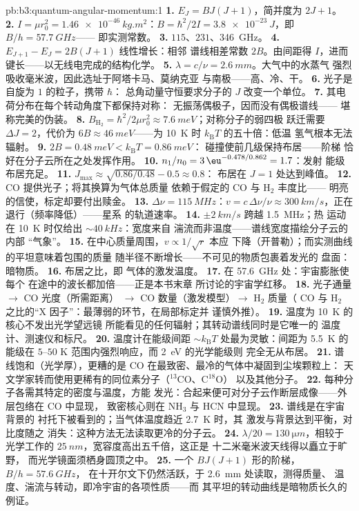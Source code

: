 \begin{solution}{pb:b3:quantum-angular-momentum:1}
\textbf{1.} $E_J = BJ(J+1)$，简并度为 $2J + 1$。
\textbf{2.} $I = \mu r_0^2 = \qty{1.46e-46}{kg.m^2}$：$B =
\hbar^2/2I = \qty{3.8e-23}{J}$，即 $B/h = \qty{57.7}{GHz}$——
即实测常数。
\textbf{3.} $115$、$231$、\qty{346}{GHz}。
\textbf{4.} $E_{J+1} - E_J = 2B(J+1)$ 线性增长：相邻
谱线相差常数 $2B$。由间距得 $I$，进而
键长——以无线电完成的结构化学。
\textbf{5.} $\lambda = c/\nu = \qty{2.6}{mm}$。大气中的水蒸气
强烈吸收毫米波，因此选址于阿塔卡马、莫纳克亚
与南极——高、冷、干。
\textbf{6.} 光子是自旋为 $1$ 的粒子，携带 $\hbar$：
总角动量守恒要求分子的 $J$
改变一个单位。
\textbf{7.} 其电荷分布在每个转动角度下都保持对称：
无振荡偶极子，因而没有偶极谱线——
堪称完美的伪装。
\textbf{8.} $B_{\text{H}_2} = \hbar^2/2\mu r_0^2 \approx
\qty{7.6}{meV}$；对称分子的弱四极
跃迁需要 $\Delta J = 2$，代价为 $6B \approx
\qty{46}{meV}$——为 \qty{10}{K} 时 $k_{\text{B}}T$ 的五十倍：低温
氢气根本无法辐射。
\textbf{9.} $2B = \qty{0.48}{meV} < k_{\text{B}}T = \qty{0.86}{meV}$：
碰撞使前几级保持布居——阶梯
恰好在分子云所在之处发挥作用。
\textbf{10.} $n_1/n_0 = 3\,\eu^{-0.478/0.862} = 1.7$：发射
能级布居充足。
\textbf{11.} $J_{\max} \approx \sqrt{0.86/0.48} - 0.5 \approx 0.8$：
布居在 $J = 1$ 处达到峰值。
\textbf{12.} CO 提供光子；将其换算为气体总质量
依赖于假定的 CO 与 H$_2$ 丰度比——
明亮的信使，标定却要付出赎金。
\textbf{13.} $\Delta\nu = \qty{115}{MHz}$：$v = c\,\Delta\nu/\nu
\approx \qty{300}{km/s}$，正在退行（频率降低）——星系
的轨道速率。
\textbf{14.} $\pm\qty{2}{km/s}$ 跨越 \qty{1.5}{MHz}；热
运动在 \qty{10}{K} 时仅给出 $\sim\qty{40}{kHz}$：宽度来自
湍流而非温度——谱线宽度描绘分子云的内部
“气象”。
\textbf{15.} 在中心质量周围，$v \propto 1/\sqrt r$ 本应
下降（开普勒）；而实测曲线的平坦意味着包围的质量
随半径不断增长——不可见的物质包裹着发光的
盘面：暗物质。
\textbf{16.} 布居之比，即
气体的激发温度。
\textbf{17.} 在 \qty{57.6}{GHz} 处：宇宙膨胀使每个
在途中的波长都加倍——正是本书末章
所讨论的宇宙学红移。
\textbf{18.} 光子通量 $\to$ CO 光度（所需距离）
$\to$ CO 数量（激发模型）$\to$ H$_2$ 质量（
CO 与 H$_2$ 之比的“X 因子”：最薄弱的环节，在局部标定并
谨慎外推）。
\textbf{19.} 温度为 \qty{10}{K} 的核心不发出光学望远镜
所能看见的任何辐射；其转动谱线同时是它唯一的
温度计、测速仪和标尺。
\textbf{20.} 温度计在能级间距 $\sim
k_{\text{B}}T$ 处最为灵敏：间距为 \qty{5.5}{K} 的能级在
$5$--$50$ K 范围内强烈响应，而 \qty{2}{eV} 的光学能级则
完全无从布居。
\textbf{21.} 谱线饱和（光学厚），更糟的是 CO
在最致密、最冷的气体中凝固到尘埃颗粒上：
天文学家转而使用更稀有的同位素分子（$^{13}$CO、C$^{18}$O）
以及其他分子。
\textbf{22.} 每种分子各需其特定的密度与温度，方能
发光：合起来便可对分子云作断层成像——外层包络在 CO 中显现，
致密核心则在 NH$_3$ 与 HCN 中显现。
\textbf{23.} 谱线是在宇宙背景的
衬托下被看到的；当气体温度趋近 \qty{2.7}{K} 时，其
激发与背景达到平衡，对比度随之
消失：这种方法无法读取更冷的分子云。
\textbf{24.} $\lambda/20 = \qty{130}{\micro m}$，相较于
光学工作的 $\qty{25}{nm}$，宽容度高出五千倍，这正是
十二米毫米波天线得以矗立于旷野，
而光学镜面须栖身圆顶之中。
\textbf{25.} 一个 $BJ(J+1)$ 形的阶梯，$B/h = \qty{57.6}{GHz}$，
在十开尔文下仍然活跃，于 \qty{2.6}{mm} 处读取，测得质量、
温度、湍流与转动，即冷宇宙的各项性质——而
其平坦的转动曲线是暗物质长久的例证。
\end{solution}
